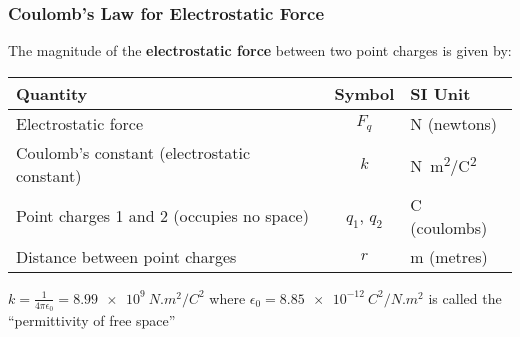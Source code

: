 \documentclass[12pt,aspectratio=169]{beamer}
\begin{document}
\begin{frame}
  \frametitle{Coulomb's Law for Electrostatic Force}
  The magnitude of the \textbf{electrostatic force} between two point charges
  is given by:
 
  
  \vspace{-.1in}
  \begin{center}
    \begin{tabular}{l|c|l}
      \rowcolor{pink}
      \textbf{Quantity} & \textbf{Symbol} & \textbf{SI Unit} \\ \hline
      Electrostatic force            & $F_q$ &  \si{\newton} (newtons)\\
      Coulomb's constant (electrostatic constant) & $k$   & \si{N.m^2/C^2} \\
      Point charges 1 and 2 (occupies no space) & $q_1$, $q_2$ & \si{C} (coulombs)\\
      Distance between point charges & $r$   & \si{\metre} (metres)\\
    \end{tabular}
  \end{center}

  \vspace{-.1in}
  $\displaystyle k=\frac{1}{4\pi\epsilon_0}=\SI{8.99e9}{N.m^2/C^2}$ where
  $\epsilon_0=\SI{8.85e-12}{C^2/N.m^2}$ is called the
  ``permittivity of free space''
\end{frame}
\end{document}
